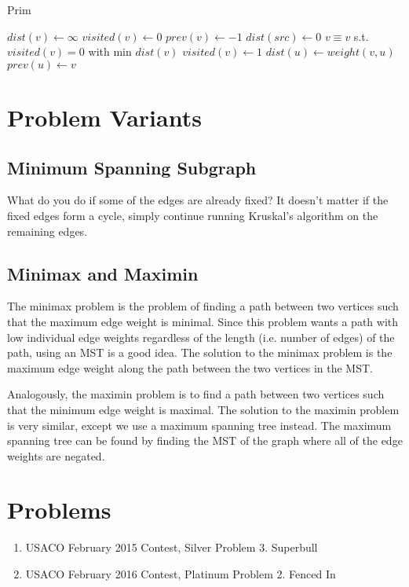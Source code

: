 \documentclass[11pt]{article}
\begin{document}
\begin{algorithm}[H]
\caption{Prim}
\begin{algorithmic}
	\State $dist(v) \gets \infty$
	\State $visited(v) \gets 0$
    \State $prev(v) \gets -1$
\EndFor
\State $dist(src) \gets 0$
	\State $v \equiv v$ s.t. $visited(v)=0$ with min $dist(v)$
    \State $visited(v) \gets 1$
				\State $dist(u) \gets weight(v, u)$
   	        	\State $prev(u) \gets v$
			\EndIf
        \EndIf
    \EndFor
\EndWhile
\end{algorithmic}
\end{algorithm}

\section{Problem Variants}

\subsection{Minimum Spanning Subgraph}

What do you do if some of the edges are already fixed? It doesn't matter if the fixed edges form a cycle, simply continue running Kruskal's algorithm on the remaining edges.

\subsection{Minimax and Maximin}

The minimax problem is the problem of finding a path between two vertices such that the maximum edge weight is minimal. Since this problem wants a path with low individual edge weights regardless of the length (i.e. number of edges) of the path, using an MST is a good idea. The solution to the minimax problem is the maximum edge weight along the path between the two vertices in the MST. 

Analogously, the maximin problem is to find a path between two vertices such that the minimum edge weight is maximal. The solution to the maximin problem is very similar, except we use a maximum spanning tree instead. The maximum spanning tree can be found by finding the MST of the graph where all of the edge weights are negated. 

\section{Problems}

\begin{enumerate}
    \item USACO February 2015 Contest, Silver Problem 3. Superbull
    \item USACO February 2016 Contest, Platinum Problem 2. Fenced In
\end{enumerate}
\end{document}
